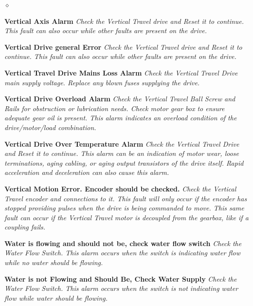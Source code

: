 \begin{list}{$\diamond$}{}
	\item \textbf{Vertical Axis Alarm} \textit{Check the Vertical Travel drive and Reset it to continue. This fault can also occur while other faults are present on the drive.}
	\item \textbf{Vertical Drive general Error} \textit{Check the Vertical Travel drive and Reset it to continue. This fault can also occur while other faults are present on the drive.}
	\item \textbf{Vertical Travel Drive Mains Loss Alarm} \textit{Check the Vertical Travel Drive main supply voltage. Replace any blown fuses supplying the drive.}
	\item \textbf{Vertical Drive Overload Alarm} \textit{Check the Vertical Travel Ball Screw and Rails for obstruction or lubrication needs. Check motor gear box to ensure adequate gear oil is present. This alarm indicates an overload condition of the drive/motor/load combination.}
	\item \textbf{Vertical Drive Over Temperature Alarm} \textit{Check the Vertical Travel Drive and Reset it to continue. This alarm can be an indication of motor wear, loose terminations, aging cabling, or aging output transistors of the drive itself. Rapid acceleration and deceleration can also cause this alarm.}
	\item \textbf{Vertical Motion Error. Encoder should be checked.} \textit{Check the Vertical Travel encoder and connections to it. This fault will only occur if the encoder has stopped providing pulses when the drive is being commanded to move. This same fault can occur if the Vertical Travel motor is decoupled from the gearbox, like if a coupling fails.}
	\item \textbf{Water is flowing and should not be, check water flow switch} \textit{Check the Water Flow Switch. This alarm occurs when the switch is indicating water flow while no water should be flowing.}
	\item \textbf{Water is not Flowing and Should Be, Check Water Supply} \textit{Check the Water Flow Switch. This alarm occurs when the switch is not indicating water flow while water should be flowing.}
\end{list}									
